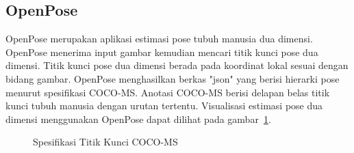 \subsection{OpenPose}

OpenPose merupakan aplikasi estimasi pose tubuh manusia dua dimensi. OpenPose menerima input gambar
kemudian mencari titik kunci pose dua dimensi. Titik kunci pose dua dimensi berada pada koordinat
lokal sesuai dengan bidang gambar. OpenPose menghasilkan berkas "json" yang berisi hierarki pose
menurut spesifikasi COCO-MS. Anotasi COCO-MS berisi delapan belas titik kunci tubuh manusia dengan
urutan tertentu. %
Visualisasi estimasi pose dua dimensi menggunakan OpenPose dapat dilihat
pada gambar~\ref{fig:coco}.

\begin{figure}[htbp]
    \begin{center}
    \end{center}
    \vspace{-20pt}
    \captionsetup{labelfont=bf, textfont=bf}
    \caption{Spesifikasi Titik Kunci COCO-MS}
    \vspace{-10pt}
    \captionsetup{labelfont=md, textfont=md}
    \label{fig:coco}
\end{figure}


